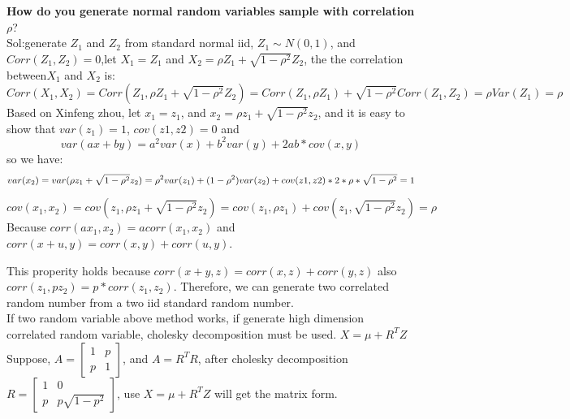 \documentclass[a4paper,11pt]{article}
\begin{document}
{\bf How do you generate normal random variables sample with correlation $\rho$}?\\
Sol:generate $Z_1$ and $Z_2$ from standard normal iid, $Z_1 \sim N(0,1)$, and $Corr(Z_1,Z_2)=0$,let $X_1=Z_1$ and $X_2=\rho Z_1+\sqrt{1-\rho^2} Z_2$, the the correlation between$X_1$ and $X_2$ is:\\
$$
Corr(X_1,X_2)=Corr(Z_1,\rho Z_1+\sqrt{1-\rho^2} Z_2)=
Corr(Z_1,\rho Z_1)+\sqrt{1-\rho^2} Corr(Z_1,Z_2)=\rho Var(Z_1)=\rho
$$
Based on Xinfeng zhou, let $x_1=z_1$, and $x_2=\rho z_1+\sqrt{1-\rho^2} z_2$, and it is easy to show that $var(z_1)=1$, $cov(z1,z2)=0$ and
$$
var(ax+by)=a^2var(x)+b^2var(y)+2ab*cov(x,y)
$$
so we have:
$$
var(x_2)=var(\rho z_1+\sqrt{1-\rho^2} z_2) \\
=\rho^2 var(z_1)+(1-\rho^2) var(z_2)+cov(z1,z2)*2*\rho*\sqrt{1-\rho^2} \\
=1
$$

$$
cov(x_1,x_2)=cov(z_1,\rho z_1+\sqrt{1-\rho^2} z_2)=cov(z_1,\rho z_1)+cov(z_1,\sqrt{1-\rho^2} z_2)=\rho
$$
Because $corr(ax_1,x_2)=a corr(x_1,x_2)$ and  $corr(x+u,y)=corr(x,y)+corr(u,y)$.

This properity holds because $corr(x+y,z)=corr(x,z)+corr(y,z)$ also $corr(z_1,pz_2)=p*corr(z_1,z_2)$. Therefore, we can generate two correlated random number from a two iid standard random number.\\
If two random variable above method works, if generate high dimension correlated random variable, cholesky decomposition must be used. $X=\mu +R^T Z$\\
Suppose, $A=\begin{bmatrix} 1 & p \\ p & 1 \end{bmatrix}$, and $A=R^T R$, after cholesky decomposition $R=\begin{bmatrix} 1 & 0 \\ p & p\sqrt{1-p^2} \end{bmatrix}$, use $X=\mu +R^T Z$ will get the matrix form.\\
\end{document}
